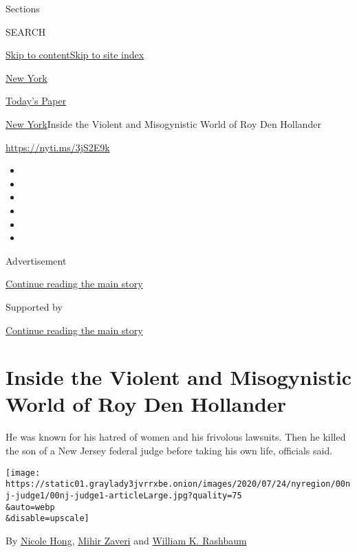 Sections

SEARCH

\protect\hyperlink{site-content}{Skip to
content}\protect\hyperlink{site-index}{Skip to site index}

\href{https://www.nytimes3xbfgragh.onion/section/nyregion}{New York}

\href{https://myaccount.nytimes3xbfgragh.onion/auth/login?response_type=cookie\&client_id=vi}{}

\href{https://www.nytimes3xbfgragh.onion/section/todayspaper}{Today's
Paper}

\href{/section/nyregion}{New York}\textbar{}Inside the Violent and
Misogynistic World of Roy Den Hollander

\url{https://nyti.ms/3jS2E9k}

\begin{itemize}
\item
\item
\item
\item
\item
\item
\end{itemize}

Advertisement

\protect\hyperlink{after-top}{Continue reading the main story}

Supported by

\protect\hyperlink{after-sponsor}{Continue reading the main story}

\hypertarget{inside-the-violent-and-misogynistic-world-of-roy-den-hollander}{%
\section{Inside the Violent and Misogynistic World of Roy Den
Hollander}\label{inside-the-violent-and-misogynistic-world-of-roy-den-hollander}}

He was known for his hatred of women and his frivolous lawsuits. Then he
killed the son of a New Jersey federal judge before taking his own life,
officials said.

\texttt{[image: https://static01.graylady3jvrrxbe.onion/images/2020/07/24/nyregion/00nj-judge1/00nj-judge1-articleLarge.jpg?quality=75\\\&auto=webp\\\&disable=upscale]}

By \href{https://www.nytimes3xbfgragh.onion/by/nicole-hong}{Nicole
Hong}, \href{https://www.nytimes3xbfgragh.onion/by/mihir-zaveri}{Mihir
Zaveri} and
\href{https://www.nytimes3xbfgragh.onion/by/william-k-rashbaum}{William
K. Rashbaum}

